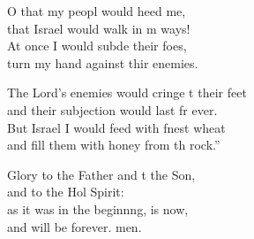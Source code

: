 \begin{psalmverse}
\begin{patverse}
O that my peopl would heed me,\Med\\
that Israel would walk in m ways!\\
At once I would subde their foes,\Med\\
turn my hand against thir enemies.

The Lord’s enemies would cringe t their feet\Med\\
and their subjection would last fr ever.\\
But Israel I would feed with f\pointup{\i}nest wheat\Med\\
and fill them with honey from th rock.”

Glory to the Father and t the Son,\Med\\
and to the Hol Spirit:\\
as it was in the beginn\pointup{\i}ng, is now,\Med\\
and will be forever. men. 
  \end{patverse}
\end{psalmverse}
